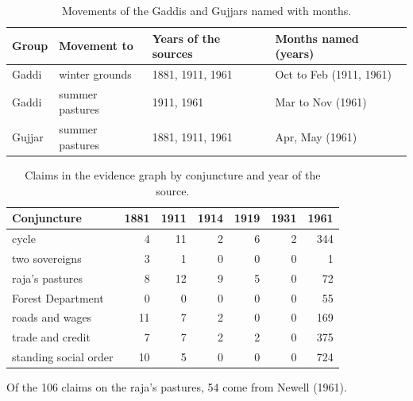 \documentclass[11pt,a4paper]{article}
\begin{document}
\begin{table}[h]\centering\small
\caption{Movements of the Gaddis and Gujjars named with months.}\label{tab:cal}
\begin{tabularx}{\textwidth}{llYY}\toprule
Group & Movement to & Years of the sources & Months named (years)\\\midrule
Gaddi & winter grounds & 1881, 1911, 1961 & Oct to Feb (1911, 1961)\\
Gaddi & summer pastures & 1911, 1961 & Mar to Nov (1961)\\
Gujjar & summer pastures & 1881, 1911, 1961 & Apr, May (1961)\\
\bottomrule\end{tabularx}
\end{table}

\begin{table}[h]\centering\small
\caption{Claims in the evidence graph by conjuncture and year of the source.}\label{tab:graph}
\begin{tabular}{lrrrrrr}\toprule
Conjuncture & 1881 & 1911 & 1914 & 1919 & 1931 & 1961\\\midrule
cycle & 4 & 11 & 2 & 6 & 2 & 344\\
two sovereigns & 3 & 1 & 0 & 0 & 0 & 1\\
raja's pastures & 8 & 12 & 9 & 5 & 0 & 72\\
Forest Department & 0 & 0 & 0 & 0 & 0 & 55\\
roads and wages & 11 & 7 & 2 & 0 & 0 & 169\\
trade and credit & 7 & 7 & 2 & 2 & 0 & 375\\
standing social order & 10 & 5 & 0 & 0 & 0 & 724\\
\bottomrule\end{tabular}

\smallskip
Of the 106 claims on the raja's pastures, 54 come from Newell (1961).
\end{table}
\end{document}
